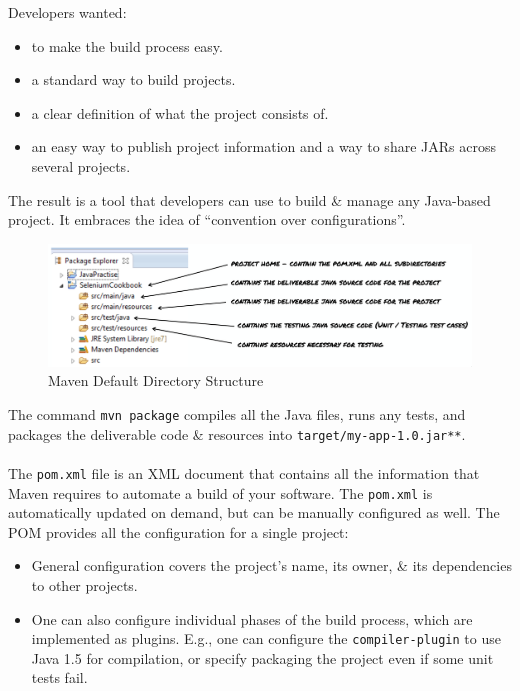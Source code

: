 \documentclass[a4paper,11pt]{article}
\begin{document}
Developers wanted:
\begin{itemize}
    \item   to make the build process easy.
    \item   a standard way to build projects.
    \item   a clear definition of what the project consists of.
    \item   an easy way to publish project information and a way to share JARs across several projects.
\end{itemize}

The result is a tool that developers can use to build \& manage any Java-based project.
It embraces the idea of ``convention over configurations''.

\begin{figure}[H]
    \centering
    \includegraphics[width=\textwidth]{images/mvn_dir_structure.png}
    \caption{Maven Default Directory Structure}
\end{figure}

The command \texttt{mvn package} compiles all the Java files, runs any tests, and packages the 
deliverable code \& resources into \verb|target/my-app-1.0.jar**|.
\\\\
The \verb|pom.xml| file is an XML document that contains all the information that Maven requires to automate 
a build of your software.
The \verb|pom.xml| is automatically updated on demand, but can be manually configured as well.
The POM provides all the configuration for a single project:
\begin{itemize}
    \item   General configuration covers the project's name, its owner, \& its dependencies to other projects.
    \item   One can also configure individual phases of the build process, which are implemented as plugins.
            E.g., one can configure the \verb|compiler-plugin| to use Java 1.5 for compilation, or specify
            packaging the project even if some unit tests fail.
\end{itemize}
\end{document}
